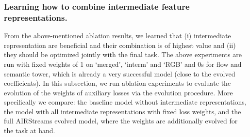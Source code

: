 \documentclass[final]{cvpr}
\begin{document}
\begin{table} \begin{center}

\caption{Ablation study: Performance when evolving weights for balancing all losses from all intermediate representations, compared to manually tuned loss combinations.
Accuracy(\%) for HMDB and mAP(\%) for Charades are shown.}
\label{tab:evo}
\end{center}
\end{table}

\vspace{-0.4cm}
\subsubsection{Learning how to combine intermediate feature representations.}
From the above-mentioned ablation results, we learned that (i) intermediate representation are beneficial and their combination is of highest value and (ii) they should be optimized jointly with the final task. The above experiments are run with fixed weights of 1 on `merged', `interm' and `RGB' and 0s for flow and semantic tower, which is already a very successful model (close to the evolved coefficients). 
In this subsection, we run ablation experiments to evaluate the evolution of the weights of auxiliary losses via the evolution procedure. More specifically we compare: the baseline model without intermediate representations, the model with all intermediate representations with fixed loss weights, and the full AIRStreams evolved model, where the weights are additionally evolved for the task at hand. 






   
\end{document}
